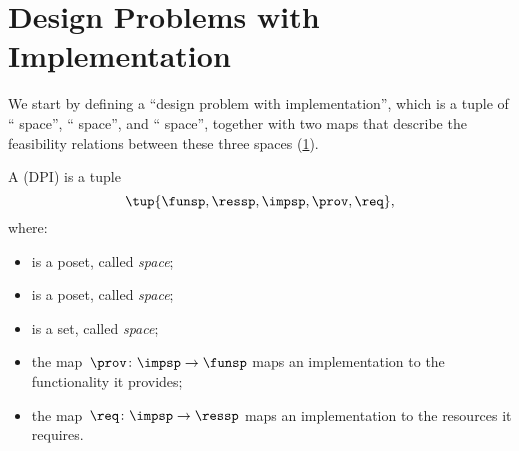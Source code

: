 
\section[DPIs]{Design Problems with Implementation}
\label{sec:Design-Problems}
We start by defining a ``design problem with implementation'', which is a tuple of `` space'',
`` space'', and `` space'', together with two maps that describe the feasibility relations between these three spaces (\cref{fig:setup}).

\begin{definition}
	\label{def:DPI}
	A \emph{} (DPI) is a tuple
	\begin{equation}
		\tup{\funsp, \ressp, \impsp, \prov,\req},
	\end{equation}
	where:
	\begin{itemize}
		\item \funsp is a poset, called \emph{ space};
		\item \ressp is a poset, called \emph{ space};
		\item \impsp is a set, called \emph{ space};
		\item the map~$\prov\colon\impsp\to\funsp$
		      maps an implementation to the functionality it provides;
		\item the map~$\req\colon\impsp\to\ressp$
		      maps an implementation to the resources it requires.
	\end{itemize}

\end{definition}

\begin{figure}[h]
	\centering
	\caption{}
	\label{fig:setup}
\end{figure}

